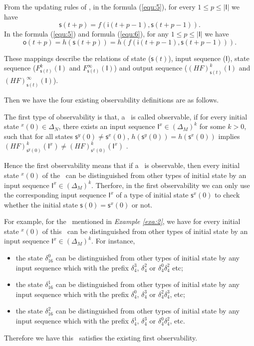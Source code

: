   
  From the updating rules of \BCNs, in the formula (\ref{equ:5}), for every $1\le p \le |\mathsf{I}|$ we have 
 \[\mathsf{s}(t+p)=f(\mathsf{i}(t+p-1),\mathsf{s}(t+p-1)).\] 
 In the formula (\ref{equ:5}) and formula (\ref{equ:6}), for any $1\le p \le |\mathsf{I}|$ we have  
 \[\mathsf{o}(t+p)=h(\mathsf{s}(t+p))=h(f(\mathsf{i}(t+p-1),\mathsf{s}(t+p-1))).\] 

These mappings describe the relations of state ($\mathsf{s}(t)$), input sequence ($\mathsf{I}$), state sequence ($F^k_{\mathsf{s}(t)}(\mathsf{I})$ and $F^{\infty}_{\mathsf{s}(t)}(\mathsf{I})$) and output sequence ($(HF)^k_{\mathsf{s}(t)}(\mathsf{I})$ and $(HF)^{\infty}_{\mathsf{s}(t)}(\mathsf{I})$). 

Then we have the four existing observability definitions are as follows.

\begin{definition} 
The first type of observability is that, a \BCN\ is called observable, if for every initial state \State$^{x}(0)$$\in \Delta_N$, there exists an input sequence $\mathsf{I}^x\in(\Delta_M)^k$ for some $k>0$, such that for all states $\mathsf{s}^{y}(0)\neq \mathsf{s}^{x}(0)$, $h(\mathsf{s}^{y}(0))=h(\mathsf{s}^{x}(0))$ implies $(HF)^k_{\mathsf{s}^{y}(0)}(\mathsf{I}^x)\neq (HF)^k_{{\mathsf{s}^{x}(0)}}(\mathsf{I}^x)$ \cite{cheng2009controllability}.
\end{definition}

Hence the first observability means that if a \BCN\ is observable, then every initial state \State$^{x}(0)$ of the \BCN\ can be distinguished from other types of initial state by an input sequence $\mathsf{I}^x \in(\Delta_M)^k$. Therfore, in the first observability we can only use the corresponding input sequence $\mathsf{I}^x$ of a type of initial state $\mathsf{s}^{x}(0)$ to check whether the initial state $\mathsf{s}(0)=\mathsf{s}^{x}(0)$ or not. 
\begin{example}
For example, for the \BCN\ mentioned in {\em Example \ref{exa:2}}, we have for every initial state \State$^{x}(0)$ of this \BCN\ can be distinguished from other types of initial state by an input sequence $\mathsf{I}^x \in(\Delta_M)^k$.  For instance,
\begin{itemize}
  \item the state $\delta_{16}^0$ can be distinguished from other types of initial state by any input sequence which with the prefix $\delta_{4}^3$, $\delta_{4}^2$ or $\delta_{4}^0  \delta_{4}^2$  etc;
  \item the state $\delta_{16}^1$ can be distinguished from other types of initial state by any input sequence which with the prefix $\delta_{4}^0$, $\delta_{4}^3$ or $\delta_{4}^2 \delta_{4}^3$, etc;
  \item the state $\delta_{16}^2$ can be distinguished from other types of initial state by any input sequence which with the prefix $\delta_{4}^1$, $\delta_{4}^3$ or $\delta_{4}^0 \delta_{4}^2$, etc.
\end{itemize} 

Therefore we have this \BCN\ satisfies the existing first observability.
\label{exa:4}
\end{example}   

